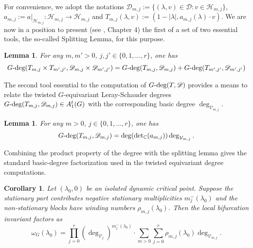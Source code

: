 \documentclass[twoside,11pt]{article}
\def\bc{{\mathbb{C}}}
\def\gdeg{G\text{\rm -deg}}
\newtheorem{lemma}[theorem]{Lemma}
\newtheorem{corollary}[theorem]{Corollary}
\begin{document}
For convenience, we adopt the notations $\mathscr D_{m,j} := \{(\lambda,v) \in \mathscr D : v \in \mathcal H_{m,j} \}$, $a_{m,j}:= a|_{\mathcal H_{m,j}} : \mathcal H_{m,j} \rightarrow \mathcal H_{m,j}$ and $T_{m,j}(\lambda,v) := (1 - |\lambda|, a_{m,j}(\lambda) \cdot v)$.
We are now in a position to present (see \cite{AED}, Chapter 4) the first of a set of two essential tools, the so-called Splitting Lemma, for this purpose.
\begin{lemma}\label{lemm:splitting_lemma} \rm
For any $m,m' > 0$, $j,j' \in \{0,1,\ldots,r\}$, one has
\[
\gdeg(T_{m,j} \times T_{m',j'},\mathscr D_{m,j} \times \mathscr D_{m',j'}) =  \gdeg(T_{m,j}, \mathscr D_{m,j}) + \gdeg(T_{m',j'}, \mathscr D_{m',j'})
\]
\end{lemma}
The second tool essential to the computation of $\gdeg(T,\mathscr D)$ provides a means to relate the twisted $G$-equivariant Leray-Schauder degrees $\gdeg(T_{m,j}, \mathscr D_{m,j}) \in A_1^t(G)$ with the corresponding basic degree $\deg_{\mathcal V_{m,j}}$.
\begin{lemma} \rm
For any $m > 0$, $j \in \{0,1,\ldots,r\}$, one has
    \[
    \gdeg( T_{m,j}, \mathscr D_{m,j}) = \deg(\det\nolimits_\bc(a_{m,j})) \deg_{\mathcal V_{m,j}}.
    \]
\end{lemma}
Combining the product property of the degree with the splitting lemma gives the standard basic-degree factorization used in the twisted equivariant degree computations.
\begin{corollary}
\label{cor:standard_basic_degree_factorization}
Let $(\lambda_0,0)$ be an isolated dynamic critical point. Suppose the stationary part contributes negative stationary multiplicities $m_j^-(\lambda_0)$ and the non-stationary blocks have winding numbers $\rho_{m,j}(\lambda_0)$. Then the local bifurcation invariant factors as
\[
\omega_G(\lambda_0)
    = \prod_{j=0}^{r}
    \left(\deg_{\mathcal V_j}\right)^{m_j^-(\lambda_0)}
    \cdot
    \sum_{m>0}\sum_{j=0}^{r}
    \rho_{m,j}(\lambda_0)\deg_{\mathcal V_{m,j}}.
\]
\end{corollary}
\end{document}
